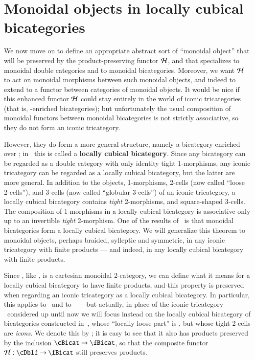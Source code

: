 \section{Monoidal objects in locally cubical bicategories}
\label{sec:mono-objects}

We now move on to define an appropriate abstract sort of ``monoidal object'' that will be preserved by the product-preserving functor $\mathcal{H}$, and that specializes to monoidal double categories and to monoidal bicategories.
Moreover, we want $\mathcal{H}$ to act on monoidal morphisms between such monoidal objects, and indeed to extend to a functor between categories of monoidal objects.
It would be nice if this enhanced functor $\mathcal{H}$ could stay entirely in the world of iconic tricategories (that is, \Icon-enriched bicategories); but unfortunately the usual composition of monoidal functors between monoidal bicategories is not strictly associative, so they do not form an iconic tricategory.

However, they do form a more general structure, namely a bicategory enriched over \cDbl; in~\cite{gg:ldstr-tricat} this is called a \textbf{locally cubical bicategory}.
Since any bicategory can be regarded as a double category with only identity tight 1-morphisms, any iconic tricategory can be regarded as a locally cubical bicategory, but the latter are more general.
In addition to the objects, 1-morphisms, 2-cells (now called ``loose 2-cells''), and 3-cells (now called ``globular 3-cells'') of an iconic tricategory, a locally cubical bicategory contains \emph{tight} 2-morphisms, and square-shaped 3-cells.
The composition of 1-morphisms in a locally cubical bicategory is associative only up to an invertible \emph{tight} 2-morphism. One of the results of~\cite{gg:ldstr-tricat} is that monoidal bicategories form a locally cubical bicategory. 
We will generalize this theorem to monoidal objects, perhaps braided, sylleptic and symmetric, in any iconic tricategory with finite products --- and indeed, in any locally cubical bicategory with finite products.

Since \cDbl, like \Icon, is a cartesian monoidal 2-category, we can define what it means for a locally cubical bicategory to have finite products, and this property is preserved when regarding an iconic tricategory as a locally cubical bicategory.
In particular, this applies to \cDblf\ and to \cBicat\ --- but actually, in place of the iconic tricategory \cBicat\ considered up until now we will focus instead on the locally cubical bicategory of bicategories constructed in~\cite{gg:ldstr-tricat}, whose ``locally loose part'' is \cBicat, but whose tight 2-cells are \emph{icons}.
We denote this by \fBicat; it is easy to see that it also has products preserved by the inclusion $\cBicat\to \fBicat$, so that the composite functor $\cH : \cDblf \to\fBicat$ still preserves products.

